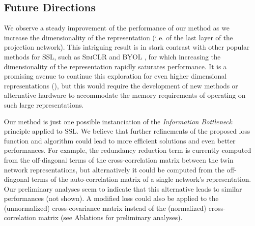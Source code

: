 \documentclass{article}
\begin{document}
\subsection{Future Directions}

We observe a steady improvement of the performance of our method as we increase the dimensionality of the representation (i.e. of the last layer of the projection network). This intriguing result is in stark contrast with other popular methods for SSL, such as \textsc{SimCLR} \cite{chen2020simple} and \textsc{BYOL} \cite{grill2020bootstrap}, for which increasing the dimensionality of the representation rapidly saturates performance. It is a promising avenue to continue this exploration for even higher dimensional representations (), but this would require the development of new methods or alternative hardware to accommodate the memory requirements of operating on such large representations.

Our method is just one possible instanciation of the \emph{Information Bottleneck} principle applied to SSL. We believe that further refinements of the proposed loss function and algorithm could lead to more efficient solutions and even better performances. For example, the redundancy reduction term is currently computed from the off-diagonal terms of the cross-correlation matrix between the twin network representations, but alternatively it could be computed from the off-diagonal terms of the auto-correlation matrix of a single network's representation. Our preliminary analyses seem to indicate that this alternative leads to similar performances (not shown). A modified loss could also be applied to the (unnormalized) cross-covariance matrix instead of the (normalized) cross-correlation matrix (see Ablations for preliminary analyses). 
\end{document}

